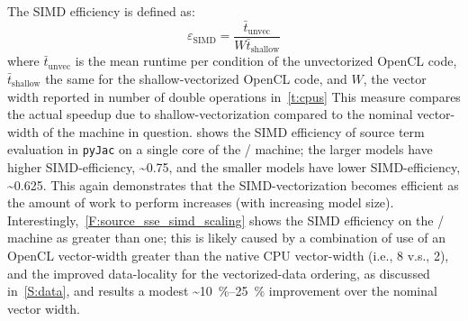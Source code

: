 \documentclass[12pt,number,sort&compress,preprint]{elsarticle}
\begin{document}
The SIMD efficiency is defined as:
\begin{equation}
 \label{e:simd_efficiency}
 \varepsilon_{\text{SIMD}} = \frac{\bar{t}_{\text{unvec}}}{W \bar{t}_{\text{shallow}}}
\end{equation}
where $\bar{t}_{\text{unvec}}$ is the mean runtime per condition of the unvectorized OpenCL code, $\bar{t}_{\text{shallow}}$ the same for the shallow-vectorized OpenCL code, and $W$, the vector width reported in number of double operations in~\cref{t:cpus}
This measure compares the actual speedup due to shallow-vectorization compared to the nominal vector-width of the machine in question.
 shows the SIMD efficiency of source term evaluation in \texttt{pyJac} on a single core of the \avx/ machine; the larger models have higher SIMD-efficiency, \textasciitilde\num{0.75}, and the smaller models have lower SIMD-efficiency, \textasciitilde\num{0.625}.
This again demonstrates that the SIMD-vectorization becomes efficient as the amount of work to perform increases (with increasing model size).
Interestingly,~\cref{F:source_sse_simd_scaling} shows the SIMD efficiency on the \sse/ machine as greater than one; this is likely caused by a combination of use of an OpenCL vector-width greater than the native CPU vector-width (i.e., \num{8} v.s., \num{2}), and the improved data-locality for the vectorized-data ordering, as discussed in~\cref{S:data}, and results a modest \textasciitilde\SIrange{10}{25}{\percent} improvement over the nominal vector width.
\end{document}
